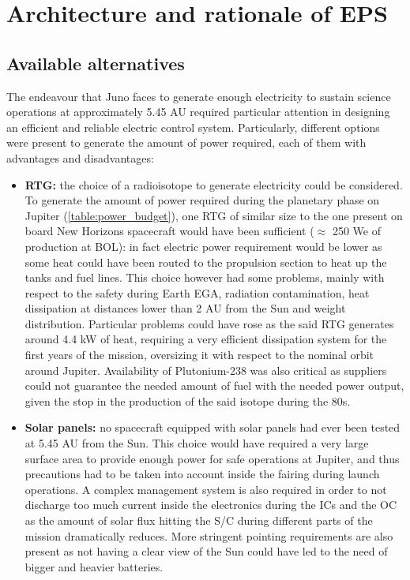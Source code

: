 \section{Architecture and rationale of EPS}
\label{sec:EPS_architecture_rationale}

\subsection{Available alternatives}
\label{subsec:available_alternatives}

The endeavour that Juno faces to generate enough electricity to sustain science operations at approximately 5.45 AU required particular attention in designing an efficient and reliable electric control system. Particularly, different options were present to generate the amount of power required, each of them with advantages and disadvantages:

\begin{itemize}
    \item \textbf{RTG:} the choice of a radioisotope to generate electricity could be considered. To generate the amount of power required during the planetary phase on Jupiter (\autoref{table:power_budget}), one RTG of similar size to the one present on board New Horizons spacecraft  would have been sufficient ($\approx$ 250 We of production at BOL):\cite{nh_rtg} in fact electric power requirement would be lower as some heat could have been routed to the propulsion section to heat up the tanks and fuel lines. This choice however had some problems, mainly with respect to the safety during Earth EGA, radiation contamination, heat dissipation at distances lower than 2 AU from the Sun and weight distribution. Particular problems could have rose as the said RTG generates around 4.4 kW of heat, requiring a very efficient dissipation system for the first years of the mission, oversizing it with respect to the nominal orbit around Jupiter. Availability of Plutonium-238 was also critical as suppliers could not guarantee the needed amount of fuel with the needed power output, given the stop in the production of the said isotope during the 80s.\cite{plutonium}
    
    \item \textbf{Solar panels:} no spacecraft equipped with solar panels had ever been tested at 5.45 AU from the Sun. This choice would have required a very large surface area to provide enough power for safe operations at Jupiter, and thus precautions had to be taken into account inside the fairing during launch operations. A complex management system is also required in order to not discharge too much current inside the electronics during the ICs and the OC as the amount of solar flux hitting the S/C during different parts of the mission dramatically reduces. More stringent pointing requirements are also present as not having a clear view of the Sun could have led to the need of bigger and heavier batteries.
\end{itemize}

